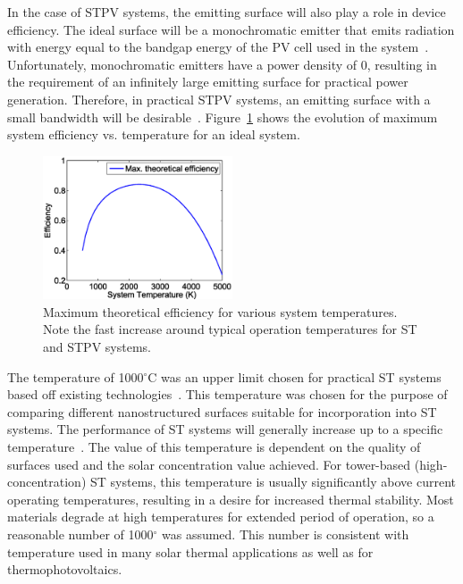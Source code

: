 \documentclass[10pt,letterpaper]{article}
\begin{document}
In the case of STPV systems, the emitting 
surface will also play a role in device efficiency.  The ideal
surface will be a monochromatic emitter that emits radiation with energy equal to the 
bandgap energy of the PV cell used in the system~\cite{L_AIP_2007}.  Unfortunately, monochromatic 
emitters have a power density of 0, resulting in the requirement of an infinitely large 
emitting surface for practical power generation.  Therefore, in practical STPV systems, an 
emitting surface with a small bandwidth will be desirable~\cite{RF_OptExp_2009}.  
Figure~\ref{Ideal} 
shows the evolution of maximum system efficiency vs. temperature for an ideal system.
\begin{figure}[ht]
\begin{center}
        \includegraphics[width=0.5\textwidth]{ideal_STPV_eff}
        \caption{\label{Ideal} Maximum theoretical efficiency for various system temperatures.  Note the fast increase
around typical operation temperatures for ST and STPV systems.}
\end{center}
\end{figure}

The temperature of 1000$^\circ$C was an upper limit chosen for practical ST systems based off existing 
technologies~\cite{RKR_RenEnRev_2013, g2}.  This temperature was chosen for the purpose of comparing different nanostructured 
surfaces suitable for incorporation into ST systems.  The performance of ST systems will generally 
increase up to a specific temperature~\cite{MS_EnConvMan_2012}.  The value of this temperature is dependent on the 
quality of surfaces used and the solar concentration value achieved.  For tower-based (high-concentration) 
ST systems, this temperature is usually significantly above current operating temperatures, resulting in a 
desire for increased thermal stability. Most materials degrade at high temperatures for extended period of 
operation, so a reasonable number of 1000$^{\circ}$ was assumed. This number is consistent with temperature used in 
many solar thermal applications as well as for thermophotovoltaics.
\end{document}
